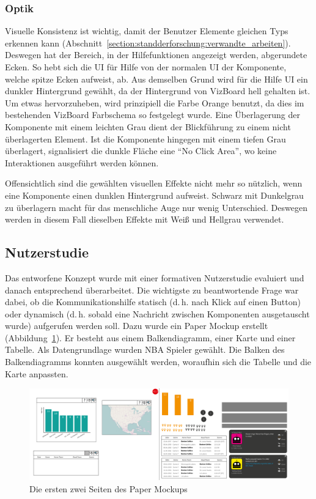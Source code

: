 \documentclass[
	headsepline,
	footsepline,
	fontsize=12pt,
	bibliography=totoc
]{scrbook}
\begin{document}
\subsubsection{Optik}

Visuelle Konsistenz ist wichtig, damit der Benutzer Elemente gleichen Typs erkennen kann (Abschnitt~\ref{section:standderforschung:verwandte_arbeiten}). Deswegen hat der Bereich, in der Hilfefunktionen angezeigt werden, abgerundete Ecken. So hebt sich die UI für Hilfe von der normalen UI der Komponente, welche spitze Ecken aufweist, ab. Aus demselben Grund wird für die Hilfe UI ein dunkler Hintergrund gewählt, da der Hintergrund von VizBoard hell gehalten ist. Um etwas hervorzuheben, wird prinzipiell die Farbe Orange benutzt, da dies im bestehenden VizBoard Farbschema so festgelegt wurde. Eine Überlagerung der Komponente mit einem leichten Grau dient der Blickführung zu einem nicht überlagerten Element. Ist die Komponente hingegen mit einem tiefen Grau überlagert, signalisiert die dunkle Fläche eine \enquote{No Click Area}, wo keine Interaktionen ausgeführt werden können. 

Offensichtlich sind die gewählten visuellen Effekte nicht mehr so nützlich, wenn eine Komponente einen dunklen Hintergrund aufweist. Schwarz mit Dunkelgrau zu überlagern macht für das menschliche Auge nur wenig Unterschied. Deswegen werden in diesem Fall dieselben Effekte mit Weiß und Hellgrau verwendet.

\subsection{Nutzerstudie}
\label{section:konzeption:einfuehrung:nutzerstudie}

Das entworfene Konzept wurde mit einer formativen Nutzerstudie evaluiert und danach entsprechend überarbeitet. Die wichtigste zu beantwortende Frage war dabei, ob die Kommunikationshilfe statisch (d.\,h. nach Klick auf einen Button) oder dynamisch (d.\,h. sobald eine Nachricht zwischen Komponenten ausgetauscht wurde) aufgerufen werden soll. Dazu wurde ein Paper Mockup \cite{Virzi1996} erstellt (Abbildung~\ref{figure:paper-mockup}). Er besteht aus einem Balkendiagramm, einer Karte und einer Tabelle. Als Datengrundlage wurden NBA Spieler gewählt. Die Balken des Balkendiagramms konnten ausgewählt werden, woraufhin sich die Tabelle und die Karte anpassten.

\begin{figure}[htbp]
   \centering
   \includegraphics[width=\textwidth]{images/konzeption-paper-mockup.png}
   \caption{Die ersten zwei Seiten des Paper Mockups}
   \label{figure:paper-mockup}
\end{figure}
\end{document}
